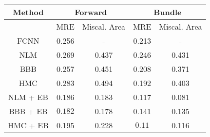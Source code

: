 \documentclass[convert={outext=.png}]{standalone}
\begin{document}
\begin{tabular}{c c c c c}
\hline
\hline
Method &  \multicolumn{2}{c}{Forward} & \multicolumn{2}{c}{Bundle} \\ \hline
 & MRE & Miscal. Area & MRE & Miscal. Area \\
 FCNN & 0.256 & - & 0.213 & - \\
 \hline
 NLM & 0.269 & 0.437 & 0.246 & 0.431 \\
 BBB & 0.257 & 0.451 & 0.208 & 0.371 \\
 HMC & 0.283 & 0.494 & 0.192 & 0.403 \\
 \hline
 NLM + EB & 0.186 & 0.183 & 0.117 & 0.081 \\
 BBB + EB & $\mathbf{0.182}$ & 0.178 & 0.141 & 0.135 \\
 HMC + EB & 0.195 & 0.228 & $\mathbf{0.11}$ & 0.116 \\
\hline
\hline
\end{tabular}
\end{document}
